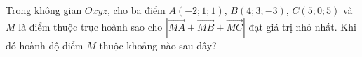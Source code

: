 \begin{ex}
Trong không gian $Oxyz$, cho ba điểm $A(-2;1;1)$, $B(4;3;-3)$, $C(5;0;5)$ và $M$ là điểm thuộc trục hoành sao cho $\left|\overrightarrow{MA}+\overrightarrow{MB}+\overrightarrow{MC}\right|$ đạt giá trị nhỏ nhất. Khi đó hoành độ điểm $M$ thuộc khoảng nào sau đây?
\end{ex}
